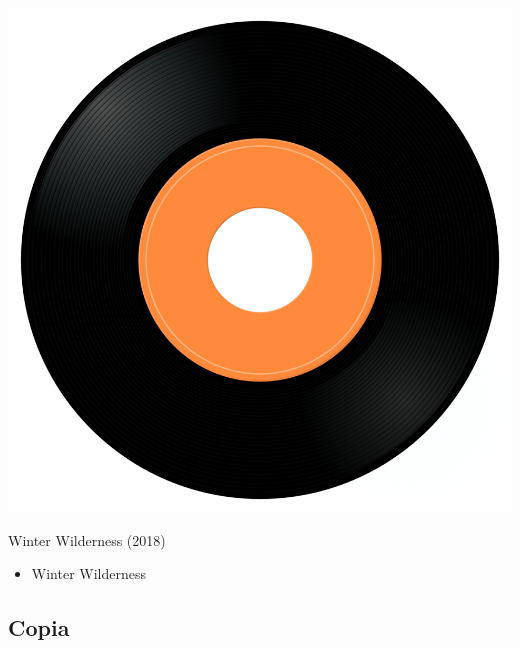 \begin{minipage}[t]{0.25\textwidth}\vspace{0pt}
\captionsetup{type=figure}
\includegraphics[width=\textwidth]{Images/cover.png}
\caption*{Winter Wilderness (2018)}
\end{minipage}
\begin{minipage}[t]{0.25\textwidth}\vspace{0pt}
\begin{itemize}[nosep,leftmargin=1em,labelwidth=*,align=left]
	\setlength{\itemsep}{0pt}
	\item Winter Wilderness 
\end{itemize}
\end{minipage}


\subsection{Copia}


